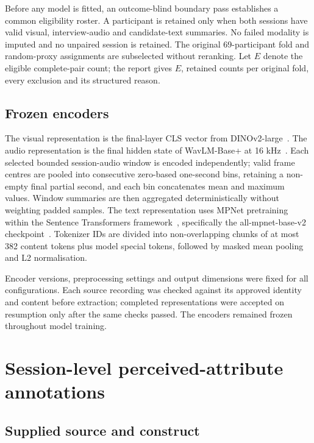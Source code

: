 Before any model is fitted, an outcome-blind boundary pass establishes a common eligibility
roster. A participant is retained only when both sessions have
valid visual, interview-audio and candidate-text summaries. No failed modality is imputed and no
unpaired session is retained. The original 69-participant fold and random-proxy assignments are
subselected without reranking. Let $E$ denote the eligible complete-pair count; the report gives
$E$, retained counts per original fold, every exclusion and its structured reason.

\subsection{Frozen encoders}

The visual representation is the final-layer CLS vector from DINOv2-large~\cite{Oquab2024}.
The audio representation is the final hidden state of WavLM-Base+ at
16 kHz~\cite{Chen2022WavLM}. Each selected bounded session-audio window is encoded independently; valid frame
centres are pooled into consecutive zero-based one-second bins, retaining a non-empty final
partial second, and each bin concatenates mean and maximum values. Window summaries are then
aggregated deterministically without weighting padded samples. The text representation uses
MPNet pretraining~\cite{Song2020MPNet} within the Sentence Transformers
framework~\cite{Reimers2019}, specifically the
all-mpnet-base-v2 checkpoint~\cite{SentenceTransformersAllMPNet2025}.
Tokenizer IDs are divided into non-overlapping chunks of at most 382 content
tokens plus model special tokens, followed by masked mean pooling and L2 normalisation.

Encoder versions, preprocessing settings and output dimensions were fixed for all configurations.
Each source recording was checked against its approved identity and content before extraction;
completed representations were accepted on resumption only after the same checks passed. The
encoders remained frozen throughout model training.

\section{Session-level perceived-attribute annotations}

\subsection{Supplied source and construct}

